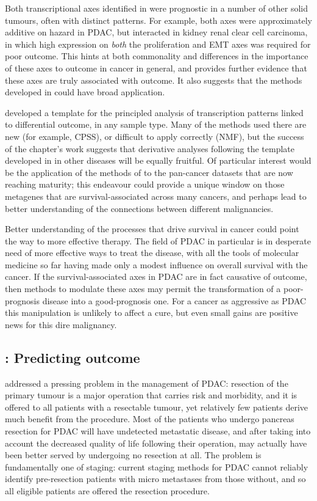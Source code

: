 \documentclass[thesis.tex]{subfiles}
\begin{document}
Both transcriptional axes identified in  were prognostic in a number of other solid tumours, often with distinct patterns.  For example, both axes were approximately additive on hazard in \gls{PDAC}, but interacted in kidney renal clear cell carcinoma, in which high expression on \emph{both} the proliferation and \gls{EMT} axes was required for poor outcome.  This hints at both commonality and differences in the importance of these axes to outcome in cancer in general, and provides further evidence that these axes are truly associated with outcome.  It also suggests that the methods developed in  could have broad application.

 developed a template for the principled analysis of transcription patterns linked to differential outcome, in any sample type.  Many of the methods used there are new (for example, \gls{CPSS}), or difficult to apply correctly (\gls{NMF}), but the success of the chapter's work suggests that derivative analyses following the template developed in  in other diseases will be equally fruitful.  Of particular interest would be the application of the methods of  to the pan-cancer datasets that are now reaching maturity; this endeavour could provide a unique window on those metagenes that are survival-associated across many cancers, and perhaps lead to better understanding of the connections between different malignancies.

Better understanding of the processes that drive survival in cancer could point the way to more effective therapy.  The field of \gls{PDAC} in particular is in desperate need of more effective ways to treat the disease, with all the tools of molecular medicine so far having made only a modest influence on overall survival with the cancer.  If the survival-associated axes in \gls{PDAC} are in fact causative of outcome, then methods to modulate these axes may permit the transformation of a poor-prognosis disease into a good-prognosis one.  For a cancer as aggressive as \gls{PDAC} this manipulation is unlikely to affect a cure, but even small gains are positive news for this dire malignancy.

\subsection{\texorpdfstring{}{Chapter 3}: Predicting outcome}
 addressed a pressing problem in the management of \gls{PDAC}: resection of the primary tumour is a major operation that carries risk and morbidity, and it is offered to all patients with a resectable tumour, yet relatively few patients derive much benefit from the procedure.  Most of the patients who undergo pancreas resection for \gls{PDAC} will have undetected metastatic disease, and after taking into account the decreased quality of life following their operation, may actually have been better served by undergoing no resection at all.  The problem is fundamentally one of staging: current staging methods for \gls{PDAC} cannot reliably identify pre-resection patients with micro metastases from those without, and so all eligible patients are offered the resection procedure.
\end{document}
